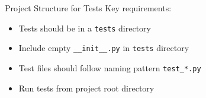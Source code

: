\documentclass[aspectratio=169]{beamer}
\begin{document}
\begin{frame}{Project Structure for Tests}
    Key requirements:
    \begin{itemize}
        \item Tests should be in a \texttt{tests} directory
        \item Include empty \texttt{\_\_init\_\_.py} in \texttt{tests} directory
        \item Test files should follow naming pattern \texttt{test\_*.py}
        \item Run tests from project root directory
    \end{itemize}
\end{frame}

\maketitle
\end{document}

